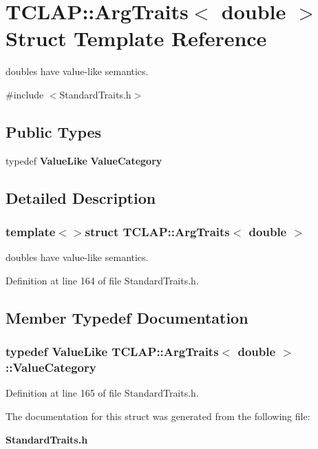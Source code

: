 \section{T\+C\+L\+A\+P\+:\+:Arg\+Traits$<$ double $>$ Struct Template Reference}
\label{structTCLAP_1_1ArgTraits_3_01double_01_4}


doubles have value-\/like semantics.  




{\ttfamily \#include $<$Standard\+Traits.\+h$>$}

\subsection*{Public Types}
\begin{DoxyCompactItemize}
\item 
typedef {\bf Value\+Like} {\bf Value\+Category}
\end{DoxyCompactItemize}


\subsection{Detailed Description}
\subsubsection*{template$<$$>$struct T\+C\+L\+A\+P\+::\+Arg\+Traits$<$ double $>$}

doubles have value-\/like semantics. 

Definition at line 164 of file Standard\+Traits.\+h.



\subsection{Member Typedef Documentation}
\subsubsection[{Value\+Category}]{\setlength{\rightskip}{0pt plus 5cm}typedef {\bf Value\+Like} {\bf T\+C\+L\+A\+P\+::\+Arg\+Traits}$<$ double $>$\+::{\bf Value\+Category}}\label{structTCLAP_1_1ArgTraits_3_01double_01_4_a06ac5f8ebfcbc537e9ce57b96836dd3d}


Definition at line 165 of file Standard\+Traits.\+h.



The documentation for this struct was generated from the following file\+:\begin{DoxyCompactItemize}
\item 
{\bf Standard\+Traits.\+h}\end{DoxyCompactItemize}
